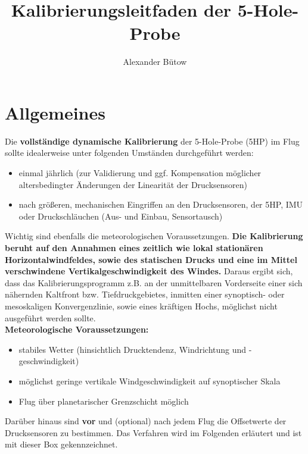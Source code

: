 \documentclass[a4paper]{article} %
\title{Kalibrierungsleitfaden der 5-Hole-Probe}
\author{Alexander Bütow}
\begin{document}
\maketitle

\section{Allgemeines}

Die \textbf{vollständige dynamische Kalibrierung} der 5-Hole-Probe (5HP) im Flug sollte idealerweise unter folgenden Umständen durchgeführt werden:

\begin{itemize}
	\item einmal jährlich (zur Validierung und ggf. Kompensation möglicher altersbedingter Änderungen der Linearität der Drucksensoren)
	\item nach größeren, mechanischen Eingriffen an den Drucksensoren, der 5HP, IMU oder Druckschläuchen (Aus- und Einbau, Sensortausch)
\end{itemize}

Wichtig sind ebenfalls die meteorologischen Voraussetzungen. \textbf{Die Kalibrierung beruht auf den Annahmen eines zeitlich wie lokal stationären Horizontalwindfeldes, sowie des statischen Drucks und eine im Mittel verschwindene Vertikalgeschwindigkeit des Windes.} Daraus ergibt sich, dass das Kalibrierungsprogramm z.B. an der unmittelbaren Vorderseite einer sich nähernden Kaltfront bzw. Tiefdruckgebietes, inmitten einer synoptisch- oder mesoskaligen Konvergenzlinie, sowie eines kräftigen Hochs, möglichst nicht ausgeführt werden sollte.\\

\textbf{Meteorologische Voraussetzungen:}

\begin{itemize}
	\item stabiles Wetter (hinsichtlich Drucktendenz, Windrichtung und -geschwindigkeit)
	\item möglichst geringe vertikale Windgeschwindigkeit auf synoptischer Skala
	\item Flug über planetarischer Grenzschicht möglich
\end{itemize}


\begin{tcolorbox}
	Darüber hinaus sind \textbf{vor} und (optional) nach jedem Flug die Offsetwerte der Drucksensoren zu bestimmen. Das Verfahren wird im Folgenden erläutert und ist mit dieser Box gekennzeichnet.
	
\end{tcolorbox}
\end{document}
